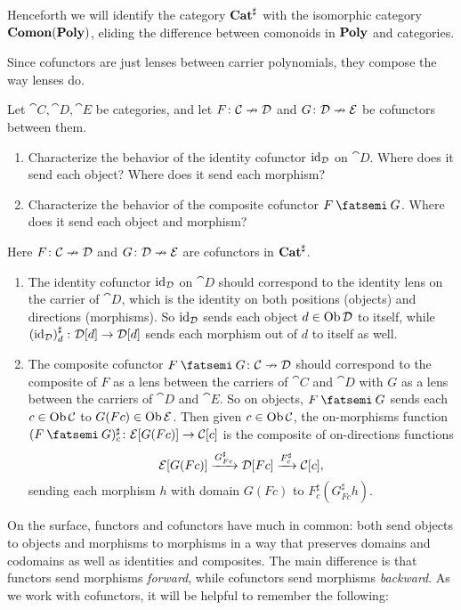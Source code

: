 \documentclass[Book-Poly]{subfiles}
\begin{document}
Henceforth we will identify the category $\mathbf{Cat}^\sharp$ with the isomorphic category $\mathbf{Comon}(\mathbf{Poly})$, eliding the difference between comonoids in $\mathbf{Poly}$ and categories.

Since cofunctors are just lenses between carrier polynomials, they compose the way lenses do.

\begin{exercise}
Let $\cat{C},\cat{D},\cat{E}$ be categories, and let $F\colon\mathcal{C}\nrightarrow\mathcal{D}$ and $G\colon\mathcal{D}\nrightarrow\mathcal{E}$ be cofunctors between them.
\begin{enumerate}
    \item Characterize the behavior of the identity cofunctor $\mathrm{id}_{\mathcal{D}}$ on $\cat{D}$.
    Where does it send each object?
    Where does it send each morphism?
    \item Characterize the behavior of the composite cofunctor $F\then G$.
    Where does it send each object and morphism?\qedhere
\end{enumerate}
\begin{solution}
Here $F\colon\mathcal{C}\nrightarrow\mathcal{D}$ and $G\colon\mathcal{D}\nrightarrow\mathcal{E}$ are cofunctors in $\mathbf{Cat}^\sharp$.
\begin{enumerate}
    \item The identity cofunctor $\mathrm{id}_{\mathcal{D}}$ on $\cat{D}$ should correspond to the identity lens on the carrier of $\cat{D}$, which is the identity on both positions (objects) and directions (morphisms).
    So $\mathrm{id}_{\mathcal{D}}$ sends each object $d\in\operatorname{Ob}\mathcal{D}$ to itself, while $\left(\mathrm{id}_{\mathcal{D}}\right)^\sharp_d\colon\mathcal{D}[d]\to\mathcal{D}[d]$ sends each morphism out of $d$ to itself as well.
    \item The composite cofunctor $F\then G\colon\cat{C}\cof\cat{D}$ should correspond to the composite of $F$ as a lens between the carriers of $\cat{C}$ and $\cat{D}$ with $G$ as a lens between the carriers of $\cat{D}$ and $\cat{E}$.
    So on objects, $F\then G$ sends each $c\in\operatorname{Ob}\mathcal{C}$ to $G(Fc)\in\operatorname{Ob}\mathcal{E}$.
    Then given $c\in\operatorname{Ob}\mathcal{C}$, the on-morphisms function $(F\then G)^\sharp_c\colon\cat{E}[G(Fc)]\to\cat{C}[c]$ is the composite of on-directions functions
    \[
        \mathcal{E}[G(Fc)]\xrightarrow{G^\sharp_{Fc}}\mathcal{D}[Fc]\xrightarrow{F^\sharp_c}\mathcal{C}[c],
    \]
    sending each morphism $h$ with domain $G(Fc)$ to $F^\sharp_c\left(G^\sharp_{Fc}h\right)$.
\end{enumerate}
\end{solution}
\end{exercise}

On the surface, functors and cofunctors have much in common: both send objects to objects and morphisms to morphisms in a way that preserves domains and codomains as well as identities and composites.
The main difference is that functors send morphisms \emph{forward}, while cofunctors send morphisms \emph{backward}.
As we work with cofunctors, it will be helpful to remember the following:
\end{document}
